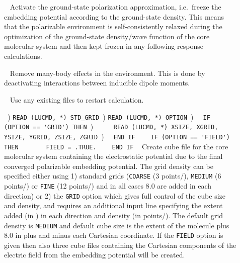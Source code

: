 \begin{description}
\item[]\verb| |\newline
Activate the ground-state polarization approximation, i.e.\ freeze the embedding potential according to the ground-state density. This means that the polarizable environment is self-consistently relaxed during the optimization of the ground-state density/wave function of the core molecular system and then kept frozen in any following response calculations.

\item[]\verb| |\newline
Remove many-body effects in the environment. This is done by deactivating interactions between inducible dipole moments. 

\item[]\verb| |\newline
Use any existing files to restart calculation.

\item[]\verb| |) \verb|READ (LUCMD, *) STD_GRID|\verb| |) \verb|READ (LUCMD, *) OPTION|\verb| |) \verb|  IF (OPTION == 'GRID') THEN|\verb| |) \verb|     READ (LUCMD, *) XSIZE, XGRID, YSIZE, YGRID, ZSIZE, ZGRID|\verb| |) \verb|  END IF| \verb| |\newline
\verb|  IF (OPTION == 'FIELD') THEN|\verb| |\newline
\verb|      FIELD = .TRUE.| \verb| |\newline
\verb|  END IF| \verb| |\newline
Create cube file for the core molecular system containing the
electrostatic potential due to the final converged polarizable
embedding potential. The grid density can be specified either
using 1) standard grids (\verb|COARSE| (3 points/\bohr{}), \verb|MEDIUM| (6 points/\bohr{})
or \verb|FINE| (12 points/\bohr{}) and in all cases 8.0 \bohr{} are added in each direction) or 2) the \verb|GRID|
option which gives full control of the cube size and density, and
requires an additional input line specifying the extent added (in \bohr{}) in each direction and
density (in points/\bohr{}). The default grid density is \verb|MEDIUM| and default cube size
is the extent of the molecule plus 8.0 \bohr{} in plus and minus each
Cartesian coordinate.
If the \verb|FIELD| option is given then also three cube files
containing the Cartesian components of the electric field from the
embedding potential will be created.


\end{description}
